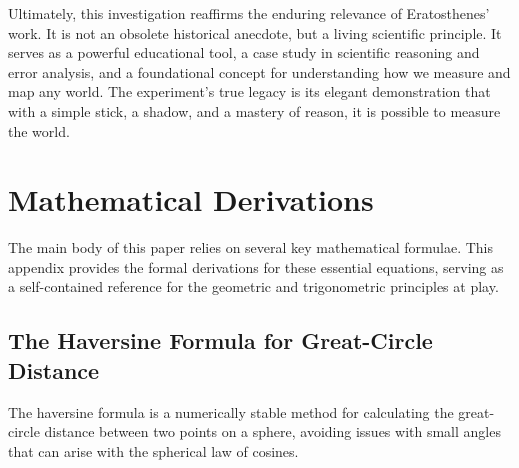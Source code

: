 \documentclass[11pt]{article}
\begin{document}
Ultimately, this investigation reaffirms the enduring relevance of Eratosthenes' work. It is not an obsolete historical anecdote, but a living scientific principle. It serves as a powerful educational tool, a case study in scientific reasoning and error analysis, and a foundational concept for understanding how we measure and map any world. The experiment's true legacy is its elegant demonstration that with a simple stick, a shadow, and a mastery of reason, it is possible to measure the world.





\appendix
\section{Mathematical Derivations}

The main body of this paper relies on several key mathematical formulae. This appendix provides the formal derivations for these essential equations, serving as a self-contained reference for the geometric and trigonometric principles at play.

\subsection{The Haversine Formula for Great-Circle Distance}

The haversine formula is a numerically stable method for calculating the great-circle distance between two points on a sphere, avoiding issues with small angles that can arise with the spherical law of cosines.
\end{document}
